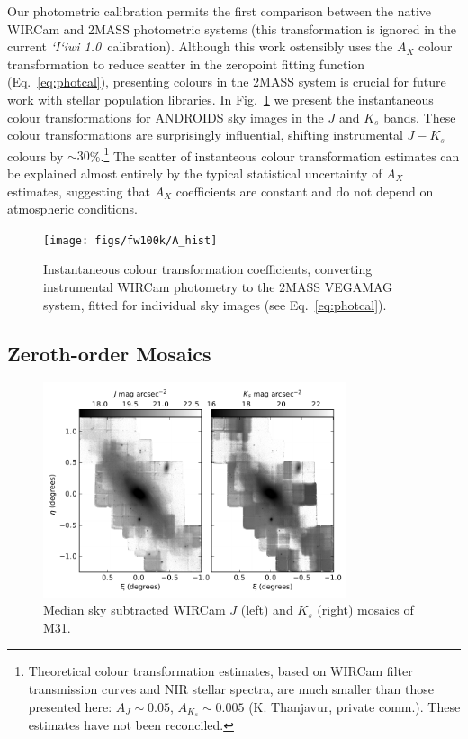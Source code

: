 \documentclass[iop]{emulateapj}
\newcommand{\sw}[1]{\textit{#1}} %
\newcommand{\iiwione}{\sw{`I`iwi 1.0}}
\newcommand{\Fig}[1]{Fig.~\ref{fig:#1}}  %
\newcommand{\Eq}[1]{Eq.~\ref{eq:#1}}  %
\begin{document}
Our photometric calibration permits the first comparison between the native WIRCam and 2MASS photometric systems (this transformation is ignored in the current \iiwione\ calibration).
Although this work ostensibly uses the $A_X$ colour transformation to reduce scatter in the zeropoint fitting function (\Eq{photcal}), presenting colours in the 2MASS system is crucial for future work with stellar population libraries.
In \Fig{colourtrans} we present the instantaneous colour transformations for ANDROIDS sky images in the $J$ and $K_s$ bands.
These colour transformations are surprisingly influential, shifting instrumental $J-K_s$ colours by $\sim 30$\%.\footnote{Theoretical colour transformation estimates, based on WIRCam filter transmission curves and NIR stellar spectra, are much smaller than those presented here: $A_J\sim 0.05$, $A_{K_s}\sim 0.005$ (K. Thanjavur, private comm.). These estimates have not been reconciled.}
The scatter of instanteous colour transformation estimates can be explained almost entirely by the typical statistical uncertainty of $A_X$ estimates, suggesting that $A_X$ coefficients are constant and do not depend on atmospheric conditions.

\begin{figure}[t]
 \centering
\texttt{[image: figs/fw100k/A\_hist]}
\caption{Instantaneous colour transformation coefficients, converting instrumental WIRCam photometry to the 2MASS VEGAMAG system, fitted for individual sky images (see \Eq{photcal}).}
\label{fig:colourtrans}
\end{figure}

\subsection{Zeroth-order Mosaics}
\label{sec:rawmosaic}

\begin{figure}[t]
	\centering
		\includegraphics[width=3.5in]{figs/raw_mosaics}
	\caption{Median sky subtracted WIRCam $J$ (left) and $K_s$ (right) mosaics of M31.}
	\label{fig:raw_mosaics}
\end{figure}
\end{document}
